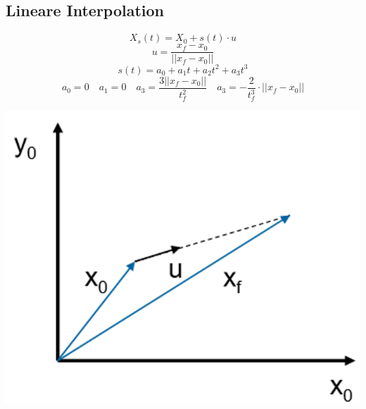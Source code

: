 \begin{minipage}{0.7\linewidth}
    \subsection{Lineare Interpolation}
    \vspace{-0.8cm}
    \[ X_s(t) = X_0 + s(t) \cdot u \]
    \[ u= \frac{x_f - x_0}{||x_f -x_0||} \]
    \[ s(t)=a_0 + a_1 t + a_2 t^2 +a_3t^3 \]
    \[ a_0=0 \quad a_1=0 \quad a_3=\frac{3||x_f-x_0||}{t_f^2} \quad a_3=-\frac{2}{t_f^3}\cdot ||x_f-x_0||  \]
\end{minipage}
\begin{minipage}{0.3\linewidth}
    \includegraphics[width=0.9\linewidth]{./bilder/LinInter}
\end{minipage}

\clearpage
